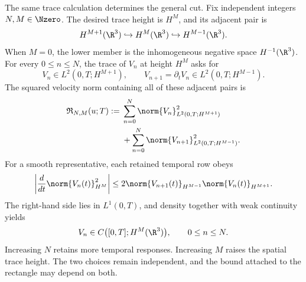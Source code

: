 The same trace calculation determines the general cut.
Fix independent integers \(N,M\in\Nzero\).
The desired trace height is \(H^M\), and its adjacent pair is
\[
  H^{M+1}(\R^3)
  \hookrightarrow
  H^M(\R^3)
  \hookrightarrow
  H^{M-1}(\R^3).
\]
When \(M=0\), the lower member is the inhomogeneous negative space \(H^{-1}(\R^3)\).
For every \(0\le n\le N\), the trace of \(V_n\) at height \(H^M\) asks for
\[
  V_n\in L^2(0,T;H^{M+1}),
  \qquad
  V_{n+1}=\partial_tV_n\in L^2(0,T;H^{M-1}).
\]
The squared velocity norm containing all of these adjacent pairs is
\begin{align*}
  \mathfrak R_{N,M}(u;T)
  :={}&
  \sum_{n=0}^{N}
  \norm{V_n}_{L^2(0,T;H^{M+1})}^{2}
  \\
  &+
  \sum_{n=0}^{N}
  \norm{V_{n+1}}_{L^2(0,T;H^{M-1})}^{2}.
\end{align*}
For a smooth representative, each retained temporal row obeys
\[
  \left|
    \frac{d}{dt}\norm{V_n(t)}_{H^M}^{2}
  \right|
  \le
  2
  \norm{V_{n+1}(t)}_{H^{M-1}}
  \norm{V_n(t)}_{H^{M+1}}.
\]
The right-hand side lies in \(L^1(0,T)\), and density together with weak continuity yields
\[
  V_n
  \in
  C\bigl([0,T];H^M(\R^3)\bigr),
  \qquad
  0\le n\le N.
\]
Increasing \(N\) retains more temporal responses.
Increasing \(M\) raises the spatial trace height.
The two choices remain independent, and the bound attached to the rectangle may depend on both.

